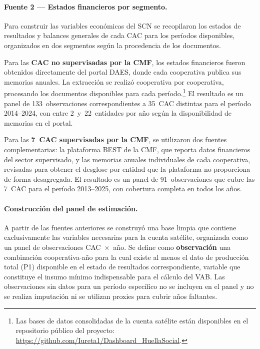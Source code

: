 \paragraph{Fuente 2 — Estados financieros por segmento.}

Para construir las variables económicas del SCN se
recopilaron los estados de resultados y balances generales
de cada CAC para los períodos disponibles, organizados en
dos segmentos según la procedencia de los documentos.

Para las \textbf{CAC no supervisadas por la CMF}, los estados
financieros fueron obtenidos directamente del portal DAES,
donde cada cooperativa publica sus memorias anuales. La
extracción se realizó cooperativa por cooperativa,
procesando los documentos disponibles para cada período.\footnote{Las
bases de datos consolidadas de la cuenta satélite están
disponibles en el repositorio público del proyecto:
\url{https://github.com/Iureta1/Dashboard_HuellaSocial}.} El
resultado es un panel de 133~observaciones correspondientes
a 35~CAC distintas para el período 2014--2024, con entre
2~y~22~entidades por año según la disponibilidad de memorias
en el portal.

Para las \textbf{7~CAC supervisadas por la CMF}, se
utilizaron dos fuentes complementarias: la plataforma BEST
de la CMF, que reporta datos financieros del sector
supervisado, y las memorias anuales individuales de cada
cooperativa, revisadas para obtener el desglose por entidad
que la plataforma no proporciona de forma desagregada. El
resultado es un panel de 91~observaciones que cubre las
7~CAC para el período 2013--2025, con cobertura completa en
todos los años.

\paragraph{Construcción del panel de estimación.}

A partir de las fuentes anteriores se construyó una base
limpia que contiene exclusivamente las variables necesarias
para la cuenta satélite, organizada como un panel de
observaciones CAC~$\times$~año. Se define como
\textbf{observación} una combinación cooperativa-año para la
cual existe al menos el dato de producción total (P1)
disponible en el estado de resultados correspondiente,
variable que constituye el insumo mínimo indispensable para
el cálculo del VAB. Las observaciones sin datos para un
período específico no se incluyen en el panel y no se realiza
imputación ni se utilizan proxies para cubrir años faltantes.

